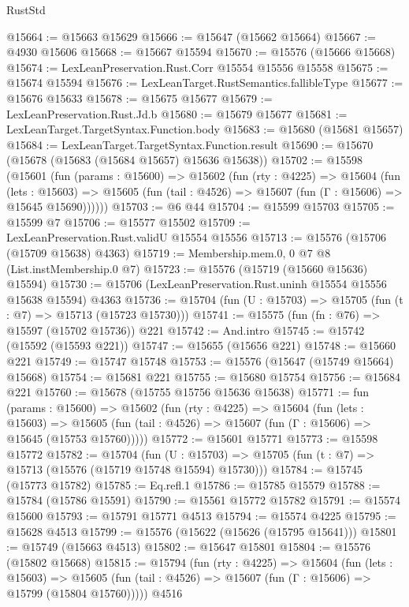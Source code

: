 \begin{lexlean}{RustStd}
\begin{coremodule}
@15664 := @15663 @15629
@15666 := @15647 (@15662 @15664)
@15667 := @4930 @15606
@15668 := @15667 @15594
@15670 := @15576 (@15666 @15668)
@15674 := LexLeanPreservation.Rust.Corr @15554 @15556 @15558
@15675 := @15674 @15594
@15676 := LexLeanTarget.RustSemantics.fallibleType
@15677 := @15676 @15633
@15678 := @15675 @15677
@15679 := LexLeanPreservation.Rust.Jd.b
@15680 := @15679 @15677
@15681 := LexLeanTarget.TargetSyntax.Function.body
@15683 := @15680 (@15681 @15657)
@15684 := LexLeanTarget.TargetSyntax.Function.result
@15690 := @15670 (@15678 (@15683 (@15684 @15657) @15636 @15638))
@15702 := @15598
    (@15601
      (fun (params : @15600) =>
      @15602
        (fun (rty : @4225) =>
        @15604
          (fun (lets : @15603) =>
          @15605 (fun (tail : @4526) => @15607 (fun (Γ : @15606) => @15645 @15690))))))
@15703 := @6 @44
@15704 := @15599 @15703
@15705 := @15599 @7
@15706 := @15577 @15502
@15709 := LexLeanPreservation.Rust.validU @15554 @15556
@15713 := @15576 (@15706 (@15709 @15638) @4363)
@15719 := Membership.mem.{0, 0} @7 @8 (List.instMembership.{0} @7)
@15723 := @15576 (@15719 (@15660 @15636) @15594)
@15730 := @15706 (LexLeanPreservation.Rust.uninh @15554 @15556 @15638 @15594) @4363
@15736 := @15704 (fun (U : @15703) => @15705 (fun (t : @7) => @15713 (@15723 @15730)))
@15741 := @15575 (fun (fn : @76) => @15597 (@15702 @15736)) @221
@15742 := And.intro
@15745 := @15742 (@15592 (@15593 @221))
@15747 := @15655 (@15656 @221)
@15748 := @15660 @221
@15749 := @15747 @15748
@15753 := @15576 (@15647 (@15749 @15664) @15668)
@15754 := @15681 @221
@15755 := @15680 @15754
@15756 := @15684 @221
@15760 := @15678 (@15755 @15756 @15636 @15638)
@15771 := fun (params : @15600) =>
  @15602
    (fun (rty : @4225) =>
    @15604
      (fun (lets : @15603) =>
      @15605 (fun (tail : @4526) => @15607 (fun (Γ : @15606) => @15645 (@15753 @15760)))))
@15772 := @15601 @15771
@15773 := @15598 @15772
@15782 := @15704
    (fun (U : @15703) => @15705 (fun (t : @7) => @15713 (@15576 (@15719 @15748 @15594) @15730)))
@15784 := @15745 (@15773 @15782)
@15785 := Eq.refl.{1}
@15786 := @15785 @15579
@15788 := @15784 (@15786 @15591)
@15790 := @15561 @15772 @15782
@15791 := @15574 @15600
@15793 := @15791 @15771 @4513
@15794 := @15574 @4225
@15795 := @15628 @4513
@15799 := @15576 (@15622 (@15626 (@15795 @15641)))
@15801 := @15749 (@15663 @4513)
@15802 := @15647 @15801
@15804 := @15576 (@15802 @15668)
@15815 := @15794
    (fun (rty : @4225) =>
    @15604
      (fun (lets : @15603) =>
      @15605 (fun (tail : @4526) => @15607 (fun (Γ : @15606) => @15799 (@15804 @15760)))))
    @4516

\end{coremodule}
\end{lexlean}

